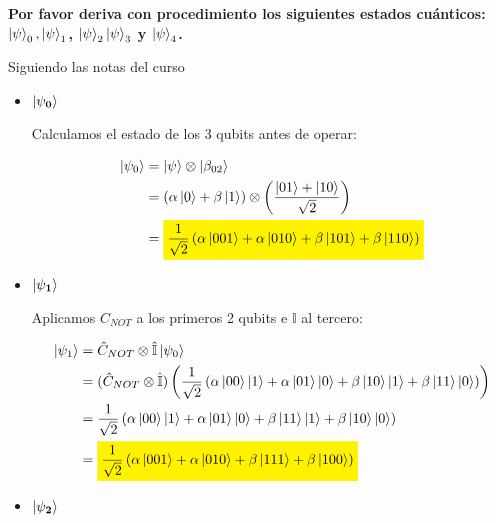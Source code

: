 \textbf{Por favor deriva con procedimiento los siguientes estados cuánticos:
$\ket{\psi}_0, \ket{\psi}_1$, $\ket{\psi}_2\ket{\psi}_3$ y $\ket{\psi}_4$.}\vspace{.2cm}

\textcolor{bibi}{Siguiendo las notas del curso}\vspace{.2cm}

\begin{itemize}
    \item $\mathbf{\ket{\psi_0}}$ \vspace{.3cm}
        
        Calculamos el estado de los 3 qubits antes de operar:

        \begin{align*}
            \ket{\psi_0} &= \ket{\psi} \otimes \ket{\beta_{02}} \\
            &= (\alpha\ket{0} + \beta\ket{1}) \otimes
            \left(\frac{\ket{01}+\ket{10}}{\sqrt{2}}\right)\\
            &=
            \mathcolorbox{yellow}{\frac{1}{\sqrt{2}}\left(\alpha\ket{001}+\alpha\ket{010}+\beta\ket{101}+\beta\ket{110}\right)}\\
        \end{align*}        

    \item $\mathbf{\ket{\psi_1}}$\vspace{.3cm}

        Aplicamos $C_{NOT}$ a los primeros 2 qubits e $\mathbb{I}$ al tercero:

        \begin{align*}
            \ket{\psi_1} &= \hat{C}_{NOT} \otimes \hat{\mathbb{I}} \ket{\psi_0} \\
            &= (\hat{C}_{NOT} \otimes \hat{\mathbb{I}})
            \left(\frac{1}{\sqrt{2}}\left(\alpha\ket{00}\ket{1}+\alpha\ket{01}\ket{0}+\beta\ket{10}\ket{1}+\beta\ket{11}\ket{0}\right)\right)
            \\
            &= \frac{1}{\sqrt{2}}\left(\alpha\ket{00}\ket{1}+\alpha\ket{01}\ket{0}+\beta\ket{11}\ket{1}+\beta\ket{10}\ket{0}\right)
            \\
            &=\mathcolorbox{yellow}{\frac{1}{\sqrt{2}}\left(\alpha\ket{001}+\alpha\ket{010}+\beta\ket{111}+\beta\ket{100}\right)}
            \\
        \end{align*}

    \item $\mathbf{\ket{\psi_2}}$\vspace{.3cm}


\end{itemize}
